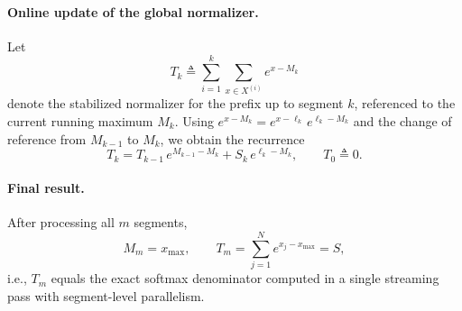 \paragraph{Online update of the global normalizer.}
Let
\begin{equation}
T_k \triangleq \sum_{i=1}^{k} \sum_{x \in X^{(i)}} e^{x - M_k}
\end{equation}
denote the stabilized normalizer for the prefix up to segment $k$, referenced to the current running maximum $M_k$.
Using $e^{x - M_k} = e^{x - \ell_k}\, e^{\ell_k - M_k}$ and the change of reference from $M_{k-1}$ to $M_k$, we obtain the recurrence
\begin{equation}
\boxed{
T_k
=
T_{k-1}\, e^{M_{k-1} - M_k}
+
S_k\, e^{\ell_k - M_k}
},
\qquad
T_0 \triangleq 0 .
\end{equation}

\paragraph{Final result.}
After processing all $m$ segments,
\begin{equation}
M_m = x_{\max},
\qquad
T_m = \sum_{j=1}^{N} e^{x_j - x_{\max}} = S,
\end{equation}
i.e., $T_m$ equals the exact softmax denominator computed in a single streaming pass with segment-level parallelism.
